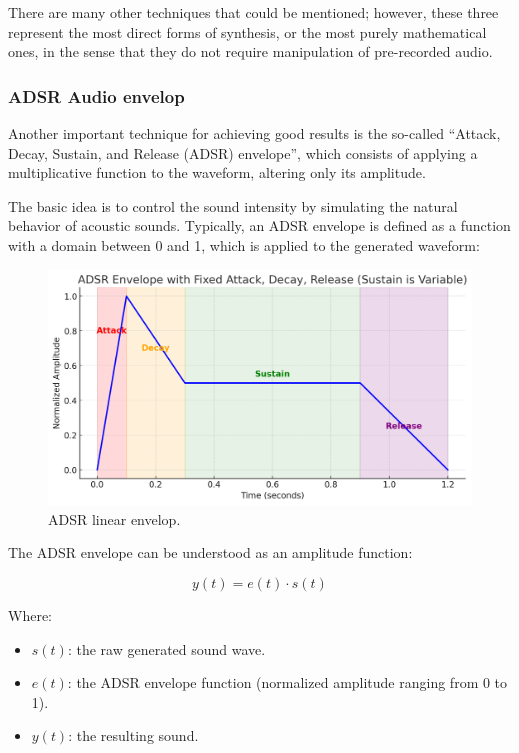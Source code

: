 \documentclass[sigconf,natbib=false]{acmart}
\begin{document}
There are many other techniques that could be mentioned; however, these three represent the most direct forms of synthesis, or the most purely mathematical ones, in the sense that they do not require manipulation of pre-recorded audio.

\subsubsection{ADSR Audio envelop}

Another important technique for achieving good results is the so-called “Attack, Decay, Sustain, and Release (ADSR) envelope”, which consists of applying a multiplicative function to the waveform, altering only its amplitude.

The basic idea is to control the sound intensity by simulating the natural behavior of acoustic sounds. Typically, an ADSR envelope is defined as a function with a domain between 0 and 1, which is applied to the generated waveform:

\begin{figure}[h]
 \centering
 \includegraphics[width=\linewidth]{figs/adsr.png}
 \caption{ADSR linear envelop.}
\end{figure}

The ADSR envelope can be understood as an amplitude function:

\[
y(t) = e(t) \cdot s(t)
\]

Where:

\begin{itemize}
\item \( s(t) \): the raw generated sound wave.
\item \( e(t) \): the ADSR envelope function (normalized amplitude ranging from 0 to 1).
\item \( y(t) \): the resulting sound.
\end{itemize}
\end{document}
